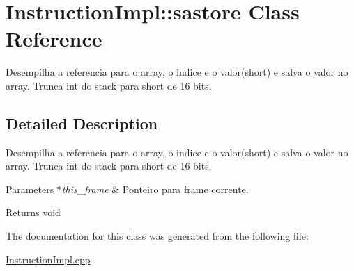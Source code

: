 \hypertarget{class_instruction_impl_1_1sastore}{}\section{Instruction\+Impl\+:\+:sastore Class Reference}
\label{class_instruction_impl_1_1sastore}


Desempilha a referencia para o array, o indice e o valor(short) e salva o valor no array. Trunca int do stack para short de 16 bits.  




\subsection{Detailed Description}
Desempilha a referencia para o array, o indice e o valor(short) e salva o valor no array. Trunca int do stack para short de 16 bits. 


\begin{DoxyParams}{Parameters}
{\em $\ast$this\+\_\+frame} & Ponteiro para frame corrente. \\
\hline
\end{DoxyParams}
\begin{DoxyReturn}{Returns}
void 
\end{DoxyReturn}


The documentation for this class was generated from the following file\+:\begin{DoxyCompactItemize}
\item 
\hyperlink{_instruction_impl_8cpp}{Instruction\+Impl.\+cpp}\end{DoxyCompactItemize}
